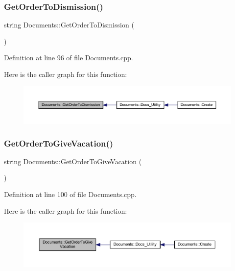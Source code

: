 \subsubsection{\texorpdfstring{Get\+Order\+To\+Dismission()}{GetOrderToDismission()}}
{\footnotesize\ttfamily string Documents\+::\+Get\+Order\+To\+Dismission (\begin{DoxyParamCaption}{ }\end{DoxyParamCaption})}



Definition at line 96 of file Documents.\+cpp.

Here is the caller graph for this function\+:
\nopagebreak
\begin{figure}[H]
\begin{center}
\leavevmode
\includegraphics[width=350pt]{class_documents_a47d56daa1f7434c712707bec1c827ea2_icgraph}
\end{center}
\end{figure}
\mbox{\label{class_documents_ab13dc4fd233d75d6be5a39142ad99b13}} 
\subsubsection{\texorpdfstring{Get\+Order\+To\+Give\+Vacation()}{GetOrderToGiveVacation()}}
{\footnotesize\ttfamily string Documents\+::\+Get\+Order\+To\+Give\+Vacation (\begin{DoxyParamCaption}{ }\end{DoxyParamCaption})}



Definition at line 100 of file Documents.\+cpp.

Here is the caller graph for this function\+:
\nopagebreak
\begin{figure}[H]
\begin{center}
\leavevmode
\includegraphics[width=350pt]{class_documents_ab13dc4fd233d75d6be5a39142ad99b13_icgraph}
\end{center}
\end{figure}
\mbox{\label{class_documents_a49f95590b3808cdada6632f702213bfa}} 
